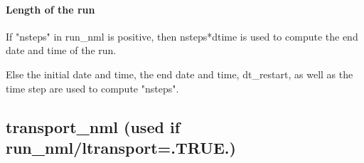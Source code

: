 \paragraph{Length of the run}

If "nsteps" in run\_nml is positive, then nsteps*dtime
is used to compute the end date and time of the run.

Else the initial date and time, the end date and time, dt\_restart,
as well as the time step are used to compute "nsteps".

\newpage

\subsection{transport\_nml (used if run\_nml/ltransport=.TRUE.)}

